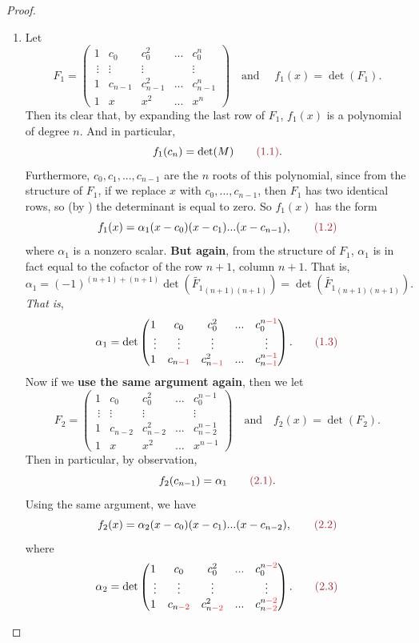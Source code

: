 \begin{proof}
\begin{enumerate}
\item Let
\[
    F_1 = \begin{pmatrix}
        1 & c_0 & c_0^2 & ... & c_0^n \\\
        \vdots & \vdots & \vdots & & \vdots \\
        1 & c_{n-1} & c_{n-1}^2 & ... & c_{n-1}^n \\
        1 & x & x^2 & ... & x^n
    \end{pmatrix}
    \quad \text{and } \quad
    f_1(x) = \det (F_1).
\]
Then its clear that, by expanding the last row of \(F_1\), \(f_1(x)\) is a polynomial of degree \(n\).
And in particular,
\[
    f_1(c_n) = \det(M) \quad \quad \MAROON{(1.1)}.
\]
Furthermore, \(c_0, c_1, ..., c_{n-1}\) are the \(n\) roots of this polynomial, since from the structure of \(F_1\), if we replace \(x\) with \(c_0, ..., c_{n - 1}\), then \(F_1\) has two identical rows, so (by ) the determinant is equal to zero.
So \(f_1(x)\) has the form
\[
    f_1(x) = \alpha_1 (x - c_0)(x - c_1) ... (x - c_{n - 1}), \quad \quad \MAROON{(1.2)}
\]
where \(\alpha_1\) is a nonzero scalar.
\textbf{But again}, from the structure of \(F_1\), \(\alpha_1\) is in fact equal to the cofactor of the row \(n + 1\), column \(n + 1\).
That is,
\[
    \alpha_1 = (-1)^{(n + 1) + (n + 1)} \det \left( \widetilde{F_1}_{(n+1)(n+1)} \right) = \det\left( \widetilde{F_1}_{(n+1)(n+1)} \right).
\]
\emph{That is},
\[
    \alpha_1 = \det \begin{pmatrix}
        1 & c_0 & c_0^2 & ... & c_0^{n \RED{- 1}} \\\
        \vdots & \vdots & \vdots & & \vdots \\
        1 & c_{n \RED{-1}} & c_{n \RED{-1}}^2 & ... & c_{n \RED{-1}}^{n \RED{- 1}}
    \end{pmatrix}. \quad \quad \MAROON{(1.3)}
\]
Now if we \textbf{use the same argument again}, then we let
\[
    F_2 = \begin{pmatrix}
        1 & c_0 & c_0^2 & ... & c_0^{n - 1} \\\
        \vdots & \vdots & \vdots & & \vdots \\
        1 & c_{n-2} & c_{n-2}^2 & ... & c_{n-2}^{n - 1} \\
        1 & x & x^2 & ... & x^{n-1}
    \end{pmatrix}
    \quad \text{and} \quad
    f_2(x) = \det(F_2).
\]
Then in particular, by observation,
\[
    f_2(c_{n - 1}) = \alpha_1 \quad \quad \MAROON{(2.1)}.
\]
Using the same argument, we have
\[
    f_2(x) = \alpha_2 (x - c_0)(x - c_1) ... (x - c_{n - 2}), \quad \quad \MAROON{(2.2)}
\]
where
\[
    \alpha_2 = \det \begin{pmatrix}
        1 & c_0 & c_0^2 & ... & c_0^{n \RED{- 2}} \\\
        \vdots & \vdots & \vdots & & \vdots \\
        1 & c_{n \RED{-2}} & c_{n \RED{-2}}^2 & ... & c_{n \RED{-2}}^{n \RED{- 2}}
    \end{pmatrix}. \quad \quad \MAROON{(2.3)}
\]


\end{enumerate}
\end{proof}
